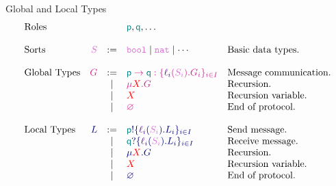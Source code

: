 \begin{frame}
\begin{center}
  \end{center}
\end{frame}

\begin{frame}{Global and Local Types}
\begin{displaymath}
  \begin{array}{lrcll}
    \text{Roles} &  &  & \Rp, \Rq, \ldots &  \\\\
    \text{Sorts} & \expt{S} & \mathrel{:=} & \sbool \mid \snat \mid \cdots & \text{Basic data types.} \\\\
    \text{Global Types} & \globalt{G} & \mathrel{:=}
    & \gmsg \Rp \Rq {{\gmsgbr {\lbl_i} {S_i} {G_i}}_{i\in I}} & \text{Message communication.} \\
    & & \mid & \grecur X G & \text{Recursion.} \\
    & & \mid & \pvar X & \text{Recursion variable.} \\
    & & \mid & \gfinish & \text{End of protocol.} \\\\
    \text{Local Types} & \localt{L} & \mathrel{:=}
    & \lsend \Rp {{\lmsgbr {\lbl_i} {S_i} {L_i}}_{i\in I}} & \text{Send message.} \\
    & & \mid & \lrecv \Rq {{\lmsgbr {\lbl_i} {S_i} {L_i}}_{i\in I}} & \text{Receive message.} \\
    & & \mid & \lrecur X G & \text{Recursion.} \\
    & & \mid & \pvar X & \text{Recursion variable.} \\
    & & \mid & \lfinish & \text{End of protocol.} \\
  \end{array}
\end{displaymath}

\end{frame}

